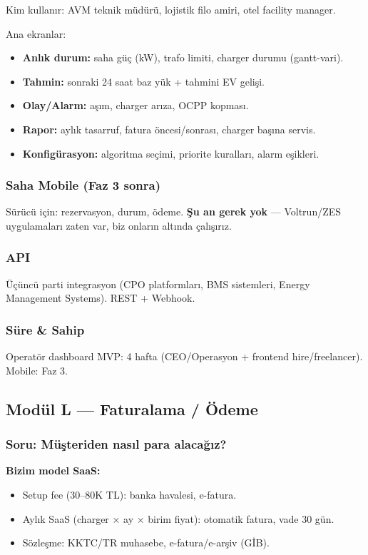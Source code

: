 \documentclass[11pt,a4paper]{article}
\begin{document}
Kim kullanır: AVM teknik müdürü, lojistik filo amiri, otel facility manager.

Ana ekranlar:
\begin{itemize}
    \item \textbf{Anlık durum:} saha güç (kW), trafo limiti, charger durumu (gantt-vari).
    \item \textbf{Tahmin:} sonraki 24 saat baz yük + tahmini EV gelişi.
    \item \textbf{Olay/Alarm:} aşım, charger arıza, OCPP kopması.
    \item \textbf{Rapor:} aylık tasarruf, fatura öncesi/sonrası, charger başına servis.
    \item \textbf{Konfigürasyon:} algoritma seçimi, priorite kuralları, alarm eşikleri.
\end{itemize}

\subsubsection{Saha Mobile (Faz 3 sonra)}
Sürücü için: rezervasyon, durum, ödeme. \textbf{Şu an gerek yok} — Voltrun/ZES uygulamaları zaten var, biz onların altında çalışırız.

\subsubsection{API}
Üçüncü parti integrasyon (CPO platformları, BMS sistemleri, Energy Management Systems). REST + Webhook.

\subsubsection{Süre \& Sahip}
Operatör dashboard MVP: 4 hafta (CEO/Operasyon + frontend hire/freelancer). Mobile: Faz 3.

\subsection{Modül L — Faturalama / Ödeme}

\subsubsection{Soru: Müşteriden nasıl para alacağız?}

\textbf{Bizim model SaaS:}
\begin{itemize}
    \item Setup fee (30--80K TL): banka havalesi, e-fatura.
    \item Aylık SaaS (charger × ay × birim fiyat): otomatik fatura, vade 30 gün.
    \item Sözleşme: KKTC/TR muhasebe, e-fatura/e-arşiv (GİB).
\end{itemize}
\end{document}
